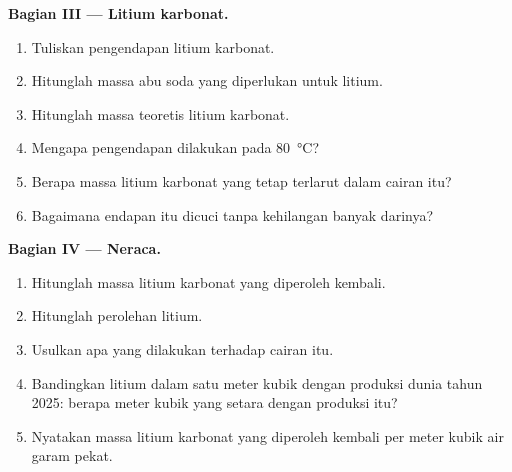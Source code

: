 \begin{problem}
\medskip
\noindent\textbf{Bagian III --- Litium karbonat.}
\begin{enumerate}[resume]
  \item Tuliskan pengendapan litium karbonat.
  \item Hitunglah massa abu soda yang diperlukan untuk litium.
  \item Hitunglah massa teoretis litium karbonat.
  \item Mengapa pengendapan dilakukan pada \qty{80}{\celsius}?
  \item Berapa massa litium karbonat yang tetap terlarut dalam cairan itu?
  \item Bagaimana endapan itu dicuci tanpa kehilangan banyak darinya?
\end{enumerate}

\medskip
\noindent\textbf{Bagian IV --- Neraca.}
\begin{enumerate}[resume]
  \item Hitunglah massa litium karbonat yang diperoleh kembali.
  \item Hitunglah perolehan litium.
  \item Usulkan apa yang dilakukan terhadap cairan itu.
  \item Bandingkan litium dalam satu meter kubik dengan produksi dunia
        tahun 2025: berapa meter kubik yang setara dengan produksi itu?
  \item Nyatakan massa litium karbonat yang diperoleh kembali per meter
        kubik air garam pekat.
\end{enumerate}
\end{problem}
